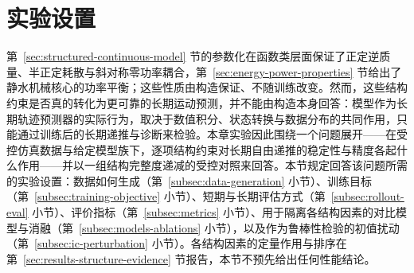 
\section{实验设置}
\label{sec:training-baselines-protocol}

第~\ref{sec:structured-continuous-model} 节的参数化在函数类层面保证了正定逆质量、半正定耗散与斜对称零功率耦合，第~\ref{sec:energy-power-properties} 节给出了静水机械核心的功率平衡；这些性质由构造保证、不随训练改变。然而，这些结构约束是否真的转化为更可靠的长期运动预测，并不能由构造本身回答：模型作为长期轨迹预测器的实际行为，取决于数值积分、状态转换与数据分布的共同作用，只能通过训练后的长期递推与诊断来检验。本章实验因此围绕一个问题展开——在受控仿真数据与给定模型族下，逐项结构约束对长期自由递推的稳定性与精度各起什么作用——并以一组结构完整度递减的受控对照来回答。本节规定回答该问题所需的实验设置：数据如何生成（第~\ref{subsec:data-generation} 小节）、训练目标（第~\ref{subsec:training-objective} 小节）、短期与长期评估方式（第~\ref{subsec:rollout-eval} 小节）、评价指标（第~\ref{subsec:metrics} 小节）、用于隔离各结构因素的对比模型与消融（第~\ref{subsec:models-ablations} 小节），以及作为鲁棒性检验的初值扰动（第~\ref{subsec:ic-perturbation} 小节）。各结构因素的定量作用与排序在第~\ref{sec:results-structure-evidence} 节报告，本节不预先给出任何性能结论。

